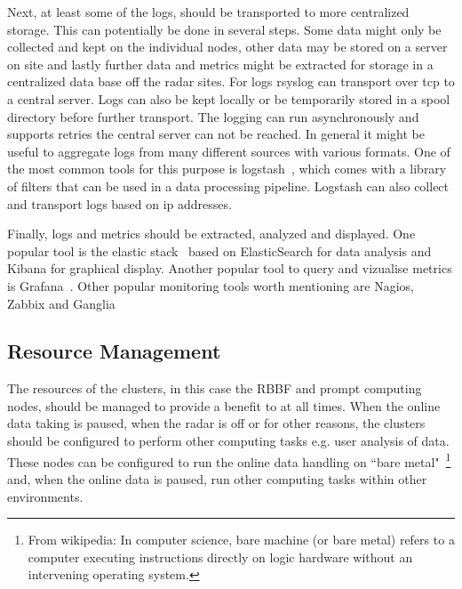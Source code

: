 \documentclass[12pt,a4paper]{article}
\begin{document}
Next, at least some of the logs, should be transported to more centralized storage. This can potentially be done in several steps. 
Some data might only be collected and kept on the individual nodes, other data may be stored on a server on site and lastly further data and metrics might be extracted for storage in a centralized data base off the radar sites.
For logs rsyslog can transport over tcp to a central server. Logs can also be kept locally or be temporarily stored in a spool directory before further transport. 
The logging can run asynchronously and supports retries the central server can not be reached. 
In general it might be useful to aggregate logs from many different sources with various formats. One of the most common tools for this purpose is logstash~\cite{logstash}, which comes with a library of filters that can be used in a data processing pipeline. Logstash can also collect and transport logs based on ip addresses. 


Finally, logs and metrics should be extracted, analyzed and displayed. One popular tool is the elastic stack~\cite{elastic} based on ElasticSearch for data analysis and Kibana for graphical display. 
Another popular tool to query and vizualise metrics is Grafana~\cite{grafana}. Other popular monitoring tools worth mentioning are Nagios, Zabbix and Ganglia



\subsection{Resource Management} \label{ssec:resource}
The resources of the clusters, in this case the RBBF and prompt computing nodes, should be managed to provide a benefit to \ED at all times.
When the online data taking is paused, when the radar is off or for other reasons, the clusters should be configured to perform other computing tasks e.g. user analysis of data.
These nodes can be configured to run the online data handling on ``bare metal"~\footnote{From wikipedia: In computer science, bare machine (or bare metal) refers to a computer executing instructions directly on logic hardware without an intervening operating system.} and, when the online data is paused, run other computing tasks within other environments.
\end{document}
